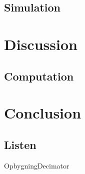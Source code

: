 \subsection{Simulation}


\section{Discussion}

\subsection{Computation}

\section{Conclusion}

\subsection{Listen}

\begin{frame}{Opbygning}{Decimator}	

\end{frame}